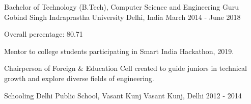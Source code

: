 

\begin{cventries}

  \cventry
    {Bachelor of Technology (B.Tech), Computer Science and Engineering} %
    {Guru Gobind Singh Indraprastha University} %
    {Delhi, India} %
    {March 2014 - June 2018} %
    {
      \begin{cvitems} %
        \item {Overall percentage: 80.71}
        \item {Mentor to college students participating in Smart India Hackathon, 2019.}
        \item {Chairperson of Foreign \& Education Cell created to guide juniors in technical growth and explore diverse fields of engineering.}
      \end{cvitems}
    }

  \cventry
    {Schooling} %
    {Delhi Public School, Vasant Kunj} %
    {Vasant Kunj, Delhi} %
    {2012 - 2014} %
    {
    }

\end{cventries}

